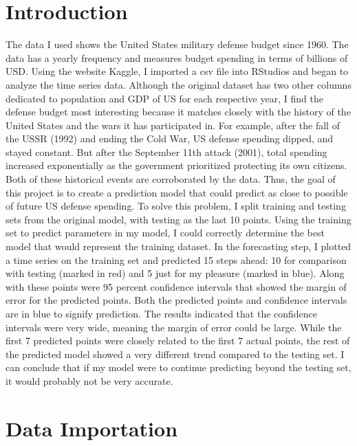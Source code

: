\documentclass[
]{article}
\begin{document}
\hypertarget{introduction}{%
\section{Introduction}\label{introduction}}

The data I used shows the United States military defense budget since
1960. The data has a yearly frequency and measures budget spending in
terms of billions of USD. Using the website Kaggle, I imported a csv
file into RStudios and began to analyze the time series data. Although
the original dataset has two other columns dedicated to population and
GDP of US for each respective year, I find the defense budget most
interesting because it matches closely with the history of the United
States and the wars it has participated in. For example, after the fall
of the USSR (1992) and ending the Cold War, US defense spending dipped,
and stayed constant. But after the September 11th attack (2001), total
spending increased exponentially as the government prioritized
protecting its own citizens. Both of these historical events are
corroborated by the data. Thus, the goal of this project is to create a
prediction model that could predict as close to possible of future US
defense spending. To solve this problem, I split training and testing
sets from the original model, with testing as the last 10 points. Using
the training set to predict parameters in my model, I could correctly
determine the best model that would represent the training dataset. In
the forecasting step, I plotted a time series on the training set and
predicted 15 steps ahead: 10 for comparison with testing (marked in red)
and 5 just for my pleasure (marked in blue). Along with these points
were 95 percent confidence intervals that showed the margin of error for
the predicted points. Both the predicted points and confidence intervals
are in blue to signify prediction. The results indicated that the
confidence intervals were very wide, meaning the margin of error could
be large. While the first 7 predicted points were closely related to the
first 7 actual points, the rest of the predicted model showed a very
different trend compared to the testing set. I can conclude that if my
model were to continue predicting beyond the testing set, it would
probably not be very accurate.

\hypertarget{data-importation}{%
\section{Data Importation}\label{data-importation}}
\end{document}
